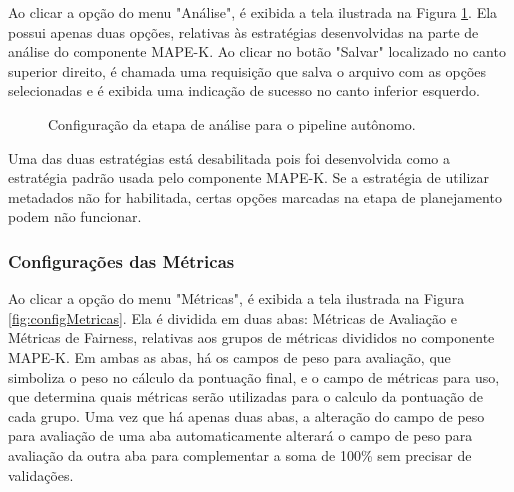 \documentclass[portugues]{ic-tese}
\begin{document}
Ao clicar a opção do menu "Análise", é exibida a tela ilustrada na Figura \ref{fig:configAnalise}. Ela possui apenas duas opções, relativas às estratégias desenvolvidas na parte de análise do componente MAPE-K. Ao clicar no botão "Salvar" localizado no canto superior direito, é chamada uma requisição que salva o arquivo com as opções selecionadas e é exibida uma indicação de sucesso no canto inferior esquerdo.

\begin{figure}[H]
    \centering
    \caption{Configuração da etapa de análise para o pipeline autônomo.}
    \label{fig:configAnalise}
\end{figure}

Uma das duas estratégias está desabilitada pois foi desenvolvida como a estratégia padrão usada pelo componente MAPE-K. Se a estratégia de utilizar metadados não for habilitada, certas opções marcadas na etapa de planejamento podem não funcionar.

\subsubsection{Configurações das Métricas}

Ao clicar a opção do menu "Métricas", é exibida a tela ilustrada na Figura \ref{fig:configMetricas}. Ela é dividida em duas abas: Métricas de Avaliação e Métricas de Fairness, relativas aos grupos de métricas divididos no componente MAPE-K. Em ambas as abas, há os campos de peso para avaliação, que simboliza o peso no cálculo da pontuação final, e o campo de métricas para uso, que determina quais métricas serão utilizadas para o calculo da pontuação de cada grupo. Uma vez que há apenas duas abas, a alteração do campo de peso para avaliação de uma aba automaticamente alterará o campo de peso para avaliação da outra aba para complementar a soma de 100\% sem precisar de validações.
\end{document}
